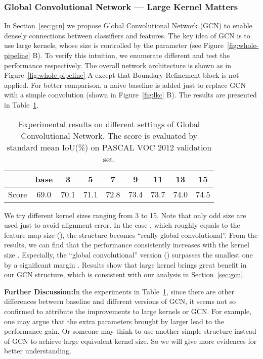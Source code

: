 \documentclass[10pt,twocolumn,letterpaper]{article}
\begin{document}
\subsubsection{Global Convolutional Network --- Large Kernel Matters}
\label{subsubsec:lkc}
	In Section~\ref{sec:gcn} we propose Global Convolutional Network (GCN) to enable densely connections between classifiers and features. The key idea of GCN is to use large kernels, whose size is controlled by the parameter  (see Figure~\ref{fig:whole-pipeline} B). To verify this intuition, we enumerate different  and test the performance respectively. The overall network architecture is shown as in Figure~\ref{fig:whole-pipeline} A except that Boundary Refinement block is not applied. For better comparison, a naive baseline is added just to replace GCN with a simple  convolution (shown in Figure~\ref{fig:lkc} B). The results are presented in Table~\ref{table:exp-on-gcn}. 
	\begin{table}[h]
	  \small
      \begin{center}	
		\begin{tabular}{|c|c|c|c|c|c|c|c|c|}
			\hline 
			 & base & 3 & 5 & 7 & 9 & 11 & 13 & 15\\
			\hline 
			Score & 69.0 & 70.1 & 71.1 & 72.8 & 73.4 & 73.7 & 74.0 & 74.5 \\
			\hline
		\end{tabular}
      \end{center}
      \caption{Experimental results on different  settings of Global Convolutional Network. The score is evaluated by standard mean IoU(\%) on PASCAL VOC 2012 validation set. }
      \label{table:exp-on-gcn}
   \end{table}
\par
   We try different kernel sizes ranging from 3 to 15. Note that only odd size are used just to avoid alignment error. In the case , which roughly equals to the feature map size (), the structure becomes ``really global convolutional''. From the results, we can find that the performance consistently increases with the kernel size . Especially, the ``global convolutional'' version () surpasses the smallest one by a significant margin . Results show that large kernel brings great benefit in our GCN structure, which is consistent with our analysis in Section~\ref{sec:gcn}. 
\par
	\textbf{Further Discussion:}\quad In the experiments in Table~\ref{table:exp-on-gcn}, since there are other differences between baseline and different versions of GCN, it seems not so confirmed to attribute the improvements to large kernels or GCN. For example, one may argue that the extra parameters brought by larger  lead to the performance gain. Or someone may think to use another simple structure instead of GCN to achieve large equivalent kernel size. So we will give more evidences for better understanding. 
\end{document}

